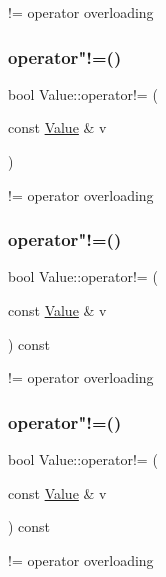 != operator overloading \mbox{\label{classValue_aa790fa6ea9b22f72910403872b67dae4}} 
\subsubsection{\texorpdfstring{operator"!=()}{operator!=()}\hspace{0.1cm}{\footnotesize\ttfamily [2/4]}}
{\footnotesize\ttfamily bool Value\+::operator!= (\begin{DoxyParamCaption}\item[{const \hyperlink{classValue}{Value} \&}]{v }\end{DoxyParamCaption})}

!= operator overloading \mbox{\label{classValue_a33fc4197bb9458f053f7e8ee09716314}} 
\subsubsection{\texorpdfstring{operator"!=()}{operator!=()}\hspace{0.1cm}{\footnotesize\ttfamily [3/4]}}
{\footnotesize\ttfamily bool Value\+::operator!= (\begin{DoxyParamCaption}\item[{const \hyperlink{classValue}{Value} \&}]{v }\end{DoxyParamCaption}) const}

!= operator overloading \mbox{\label{classValue_a33fc4197bb9458f053f7e8ee09716314}} 
\subsubsection{\texorpdfstring{operator"!=()}{operator!=()}\hspace{0.1cm}{\footnotesize\ttfamily [4/4]}}
{\footnotesize\ttfamily bool Value\+::operator!= (\begin{DoxyParamCaption}\item[{const \hyperlink{classValue}{Value} \&}]{v }\end{DoxyParamCaption}) const}

!= operator overloading \mbox{\label{classValue_a3d7fc55aff39856902e74bf8577296cb}} 
